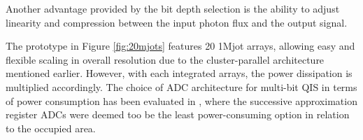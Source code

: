 Another advantage provided by the bit depth selection is the ability to adjust linearity and compression between the input photon flux and the output signal.

The prototype in Figure \ref{fig:20mjots} features 20 1Mjot arrays, allowing easy and flexible scaling in overall resolution due to the cluster-parallel architecture mentioned earlier. However, with each integrated arrays, the power dissipation is multiplied accordingly. The choice of ADC architecture for multi-bit QIS in terms of power consumption has been evaluated in \cite{ADCmultibit}, where the successive approximation register ADCs were deemed too be the least power-consuming option in relation to the occupied area. 



